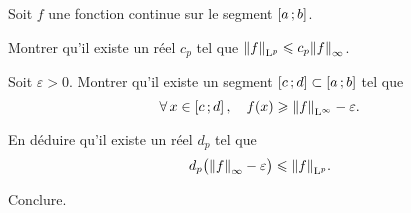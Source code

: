 \begin{exercice}
Soit $f$ une fonction continue sur le segment $\left[a\,;b\right]$.
\begin{questions}
\item Montrer qu'il existe un réel $c_p$ tel que $\norm{f}_{\mathrm{L}^p} \leqslant c_p \norm{f}_\infty$.

\item Soit $\varepsilon > 0$. Montrer qu'il existe un segment $\left[c\,;d\right] \subset \left[a\,;b\right]$ tel que
\[
\forall x \in \interff{c}{d},\quad f(x) \geqslant \norm{f}_{\L^\infty} - \varepsilon.
\]

\item En déduire qu'il existe un réel $d_p$ tel que
\[
d_p \big(\norm{f}_\infty - \varepsilon\big) \leqslant \norm{f}_{\mathrm{L}^p}.
\]

\item Conclure.
\end{questions}
\end{exercice}

\begin{marginfigure}[-5cm]
    \centering
    
    \caption{$\fonctionligne[f]{x}{x^2\sin(10x)+1}$}
\end{marginfigure}

